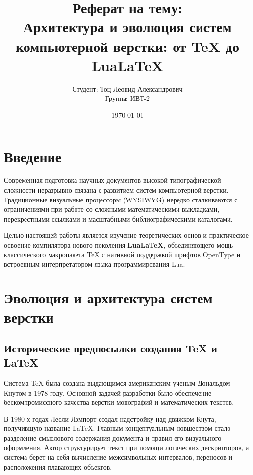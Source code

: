 \documentclass[14pt]{extreport}
\title{Реферат на тему:\\[0.5cm] \textbf{Архитектура и эволюция систем компьютерной верстки: от TeX до LuaLaTeX}}
\author{Студент: Тоц Леонид Александрович \\ Группа: ИВТ-2}
\date{\today}
\begin{document}
\maketitle
\thispagestyle{empty}

\tableofcontents
\newpage

\chapter{Введение}
Современная подготовка научных документов высокой типографической сложности неразрывно связана с развитием систем компьютерной верстки. Традиционные визуальные процессоры (WYSIWYG) нередко сталкиваются с ограничениями при работе со сложными математическими выкладками, перекрестными ссылками и масштабными библиографическими каталогами.

Целью настоящей работы является изучение теоретических основ и практическое освоение компилятора нового поколения \textbf{LuaLaTeX}, объединяющего мощь классического макропакета \TeX{} с нативной поддержкой шрифтов OpenType и встроенным интерпретатором языка программирования Lua.

\chapter{Эволюция и архитектура систем верстки}

\section{Исторические предпосылки создания TeX и LaTeX}
Система \TeX{} была создана выдающимся американским ученым Дональдом Кнутом в 1978 году. Основной задачей разработки было обеспечение бескомпромиссного качества верстки монографий и математических текстов. 

В 1980-х годах Лесли Лэмпорт создал надстройку над движком Кнута, получившую название \LaTeX{}. Главным концептуальным новшеством стало разделение смыслового содержания документа и правил его визуального оформления. Автор структурирует текст при помощи логических дескрипторов, а система берет на себя вычисление межсимвольных интервалов, переносов и расположения плавающих объектов.
\end{document}
